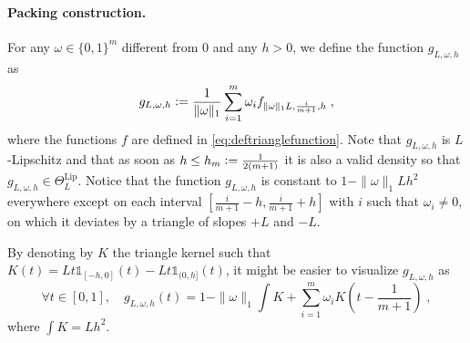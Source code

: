 \documentclass[10pt]{article} %
\def\Ind{\mathds{1}}
\newcommand{\eqdef}{\vcentcolon=}
\newcommand\p[1]{\left( {#1}\right)}
\begin{document}
    \paragraph{Packing construction.} 
    For any $\omega \in \{ 0, 1 \}^m$ different from $0$ and any $h>0$, we define the function $g_{L, \omega, h}$ as 
\begin{equation}
\label{eq:deftrianglemultiplefunction}
    g_{L, \omega, h} 
    \eqdef\frac{1}{\| \omega \|_1} \sum_{i=1}^m \omega_i f_{\| \omega \|_1 L, \frac{i}{m+1}, h} \;,
\end{equation}
where the functions $f$ are defined in \eqref{eq:deftrianglefunction}.
Note that $g_{L, \omega, h}$ is $L$-Lipschitz and that as soon as $h \leq h_m \eqdef \frac{1}{2(m+1)}$ it is also a valid density so that  $g_{L, \omega, h} \in \Theta^{\text{Lip}}_L$. Notice that the function $g_{L, \omega, h}$ is constant to $1-\| \omega \|_1 Lh^2$ everywhere except on each interval $\left[\frac{i}{m+1}-h, \frac{i}{m+1}+h\right]$ with $i$ such that $\omega_i \neq 0$, on which it deviates by a triangle of slopes $+L$ and $-L$. 

By denoting by $K$ the triangle kernel such that $K(t) = L t \Ind_{[-h, 0]}(t) - L t \Ind_{(0, h]}(t)$, it might be easier to visualize $g_{L, \omega, h}$ as
\begin{equation}
\label{nddgserrzw}
    \forall t \in [0, 1], \quad
    g_{L, \omega, h}(t) = 1 - \| \omega \|_1 \int K + \sum_{i=1}^m \omega_i K\p{t - \frac{1}{m+1}} \;,
\end{equation}
where $\int K = Lh^2$.
\end{document}
